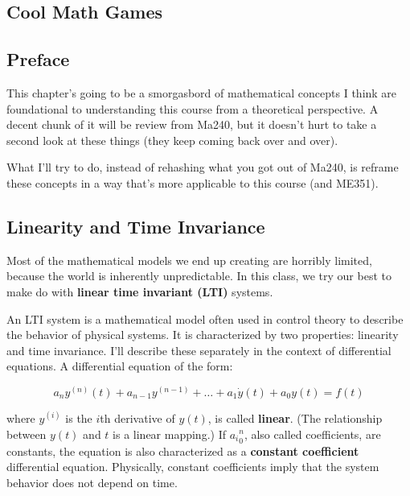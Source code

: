 \documentclass{report}
\begin{document}
\begin{onehalfspacing}
\begin{flushleft}
\pagebreak

\chapter{Cool Math Games}

\section*{Preface}

This chapter's going to be a smorgasbord of mathematical concepts I think are foundational to understanding this course from a theoretical perspective. A decent chunk of it will be review from Ma240, but it doesn't hurt to take a second look at these things (they keep coming back over and over).

\medskip

What I'll try to do, instead of rehashing what you got out of Ma240, is reframe these concepts in a way that's more applicable to this course (and ME351).

\section{Linearity and Time Invariance}

Most of the mathematical models we end up creating are horribly limited, because the world is inherently unpredictable. In this class, we try our best to make do with \textbf{linear time invariant (LTI)} systems. 

\medskip

An LTI system is a mathematical model often used in control theory to describe the behavior of physical systems. It is characterized by two properties: linearity and time invariance. I'll describe these separately in the context of differential equations. A differential equation of the form:

\vspace{-0.1in}
\[a_n y^{(n)} (t) + a_{n-1} y^{(n-1)} + \dots + a_1 \dot{y}(t) + a_0 y(t) = f(t)\]

where \(y^{(i)}\) is the \(i\)th derivative of \(y(t)\), is called \textbf{linear}. (The relationship between \(y(t)\) and \(t\) is a linear mapping.) If \({a_i}_0^n\), also called coefficients, are constants, the equation is also characterized as a \textbf{constant coefficient} differential equation. Physically, constant coefficients imply that the system behavior does not depend on time. 

\medskip


\end{flushleft}
\end{onehalfspacing}
\end{document}
